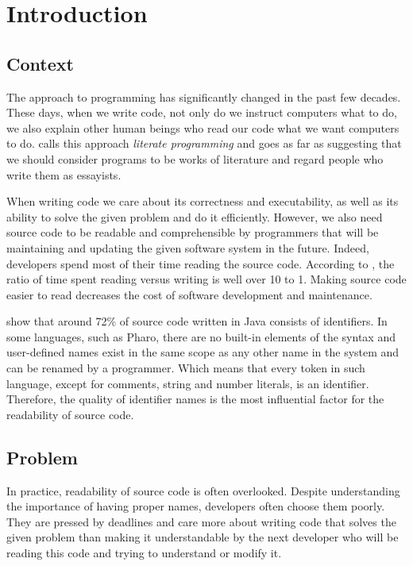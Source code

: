 \chapter{Introduction}
\label{chap:Introduction}
\mtoc

\section{Context}

The approach to programming has significantly changed in the past few decades. These days, when we write code, not only do we instruct computers what to do, we also explain other human beings who read our code what we want computers to do. \cite{Knut84} calls this approach \textit{literate programming} and goes as far as suggesting that we should consider programs to be works of literature and regard people who write them as essayists.

When writing code we care about its correctness and executability, as well as its ability to solve the given problem and do it efficiently. However, we also need source code to be readable and comprehensible by programmers that will be maintaining and updating the given software system in the future. Indeed, developers spend most of their time reading the source code. According to \cite{Mart09}, the ratio of time spent reading versus writing is well over 10 to 1. Making source code easier to read decreases the cost of software development and maintenance.

\cite{Deis06} show that around 72\% of source code written in Java consists of identifiers. In some languages, such as Pharo, there are no built-in elements of the syntax and user-defined names exist in the same scope as any other name in the system and can be renamed by a programmer. Which means that every token in such language, except for comments, string and number literals, is an identifier. Therefore, the quality of identifier names is the most influential factor for the readability of source code.

\section{Problem}
\label{sec:Introduction-Problem}

In practice, readability of source code is often overlooked. Despite understanding the importance of having proper names, developers often choose them poorly. They are pressed by deadlines and care more about writing code that solves the given problem than making it understandable by the next developer who will be reading this code and trying to understand or modify it.

